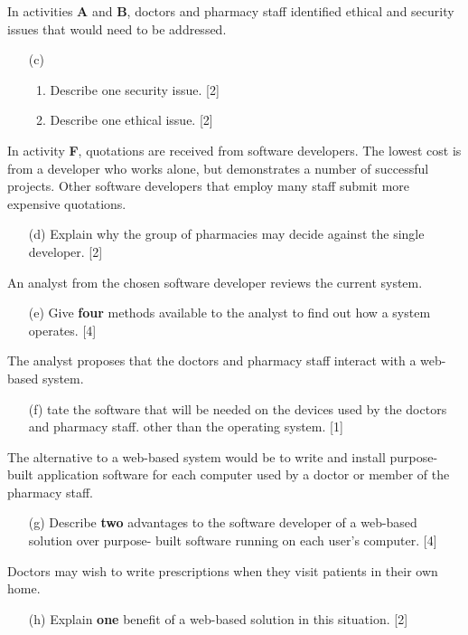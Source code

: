 In activities \textbf{A} and \textbf{B}, doctors and pharmacy staff
identified ethical and security issues that would need to be addressed. 
\begin{enumerate}
\item[(c)] {}
\begin{enumerate}
\item Describe one security issue. \hfill{}{[}2{]}
\item Describe one ethical issue. \hfill{}{[}2{]}
\end{enumerate}
\end{enumerate}
In activity \textbf{F}, quotations are received from software developers.
The lowest cost is from a developer who works alone, but demonstrates
a number of successful projects. Other software developers that employ
many staff submit more expensive quotations. 
\begin{enumerate}
\item[(d)] Explain why the group of pharmacies may decide against the single
developer. \hfill{}{[}2{]}
\end{enumerate}
An analyst from the chosen software developer reviews the current
system. 
\begin{enumerate}
\item[(e)] Give \textbf{four} methods available to the analyst to find out how
a system operates. \hfill{}{[}4{]}
\end{enumerate}
The analyst proposes that the doctors and pharmacy staff interact
with a web-based system. 
\begin{enumerate}
\item[(f)] tate the software that will be needed on the devices used by the
doctors and pharmacy staff. other than the operating system. \hfill{}{[}1{]}
\end{enumerate}
The alternative to a web-based system would be to write and install
purpose-built application software for each computer used by a doctor
or member of the pharmacy staff. 
\begin{enumerate}
\item[(g)] Describe \textbf{two} advantages to the software developer of a web-based
solution over purpose- built software running on each user's computer.
\hfill{}{[}4{]}
\end{enumerate}
Doctors may wish to write prescriptions when they visit patients in
their own home. 
\begin{enumerate}
\item[(h)] Explain \textbf{one} benefit of a web-based solution in this situation.
\hfill{}{[}2{]}
\end{enumerate}
